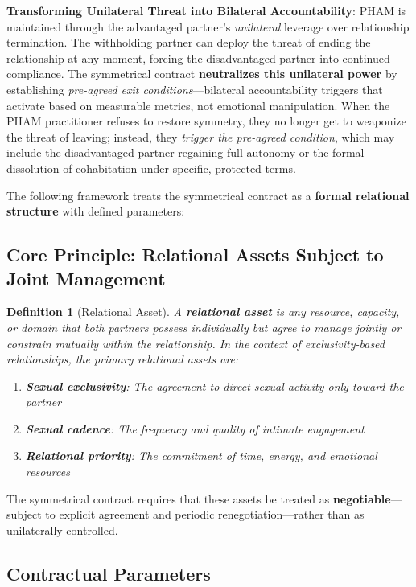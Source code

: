 \documentclass[12pt,openany]{book}
\newtheorem{definition}{Definition}[chapter]
\numberwithin{equation}{chapter}
\begin{document}
\textbf{Transforming Unilateral Threat into Bilateral Accountability}: PHAM is maintained through the advantaged partner's \textit{unilateral} leverage over relationship termination. The withholding partner can deploy the threat of ending the relationship at any moment, forcing the disadvantaged partner into continued compliance. The symmetrical contract \textbf{neutralizes this unilateral power} by establishing \textit{pre-agreed exit conditions}---bilateral accountability triggers that activate based on measurable metrics, not emotional manipulation. When the PHAM practitioner refuses to restore symmetry, they no longer get to weaponize the threat of leaving; instead, they \textit{trigger the pre-agreed condition}, which may include the disadvantaged partner regaining full autonomy or the formal dissolution of cohabitation under specific, protected terms.

The following framework treats the symmetrical contract as a \textbf{formal relational structure} with defined parameters:

\subsection{Core Principle: Relational Assets Subject to Joint Management}

\begin{definition}[Relational Asset]
A \textbf{relational asset} is any resource, capacity, or domain that both partners possess individually but agree to manage jointly or constrain mutually within the relationship. In the context of exclusivity-based relationships, the primary relational assets are:
\begin{enumerate}
    \item \textbf{Sexual exclusivity}: The agreement to direct sexual activity only toward the partner
    \item \textbf{Sexual cadence}: The frequency and quality of intimate engagement
    \item \textbf{Relational priority}: The commitment of time, energy, and emotional resources
\end{enumerate}
\end{definition}

The symmetrical contract requires that these assets be treated as \textbf{negotiable}---subject to explicit agreement and periodic renegotiation---rather than as unilaterally controlled.

\subsection{Contractual Parameters}
\end{document}
